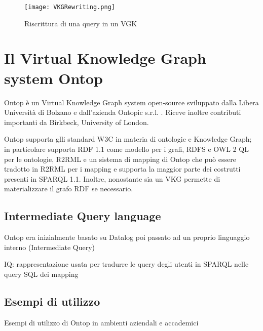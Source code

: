 \begin{figure}[h]
    \centering
    \texttt{[image: VKGRewriting.png]}
    \caption{Riscrittura di una query in un VGK}
    \label{fig:VKGRewriting}
\end{figure}


\section{Il Virtual Knowledge Graph system Ontop}
\label{sec:vkg_ontop}

Ontop è un Virtual Knowledge Graph system open-source sviluppato dalla Libera Università di Bolzano e dall'azienda Ontopic s.r.l. . Riceve inoltre
contributi importanti da Birkbeck, University of London.

Ontop supporta glli standard W3C in materia di ontologie e Knowledge Graph; in particolare supporta RDF 1.1 come modello per i grafi, RDFS e OWL 2 QL per le
ontologie, R2RML e un sistema di mapping di Ontop che può essere tradotto in R2RML per i mapping e supporta la maggior parte dei costrutti presenti in SPARQL 1.1.
Inoltre, nonostante sia un VKG permette di materializzare il grafo RDF se necessario. \cite{OntopSite}

\subsection{Intermediate Query language}
Ontop era inizialmente basato su Datalog poi passato ad un proprio linguaggio interno (Intermediate Query)

IQ: rappresentazione usata per tradurre le query degli utenti in SPARQL nelle query SQL dei mapping

\subsection{Esempi di utilizzo}
Esempi di utilizzo di Ontop in ambienti aziendali e accademici


